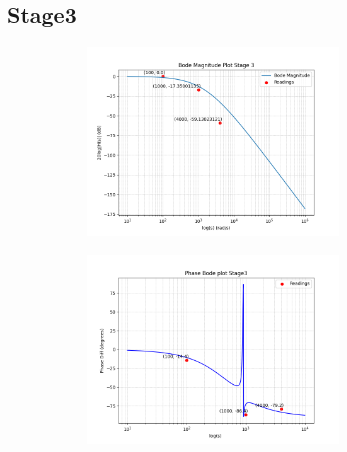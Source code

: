 \documentclass[a4paper,12pt]{article}
\begin{document}
\subsection*{Stage3}
\begin{figure}[H]
    \centering
    \begin{subfigure}{0.5\textwidth}
        \centering
        \includegraphics[height=5cm]{figs/Stage3/Magn.png}
    \end{subfigure}%
    \begin{subfigure}{0.5\textwidth}
        \centering
        \includegraphics[height=5cm]{figs/Stage3/Phase.png}
    \end{subfigure}
\end{figure}
\end{document}

